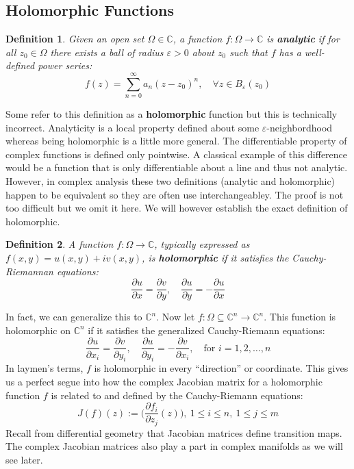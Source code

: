 \documentclass[12pt, letterpaper]{article}
\newtheorem{definition}{Definition}[section]
\newcommand{\C}{\mathbb{C}}
\newcommand{\ten}[1]{\textnormal{\textbf{#1}}}
\begin{document}
\subsection{Holomorphic Functions}

\begin{definition}\label{def 3.1}
    Given an open set $\Omega \in \C$, a function $f: \Omega \to \C$ is \ten{analytic}
    if for all $z_0 \in \Omega$ there exists a ball of radius $\varepsilon>0$ about
    $z_0$ such that $f$ has a well-defined power series:
    \begin{equation*}
        f(z) = \sum_{n=0}^\infty a_n (z-z_0)^n, \quad \forall z \in B_\varepsilon
        (z_0)
    \end{equation*}
\end{definition}

Some refer to this definition as a \textbf{holomorphic} function but this is technically
incorrect. Analyticity is a local property defined about some $\varepsilon$-neighbordhood
whereas being holomorphic is a little more general. The differentiable property of
complex functions is defined only pointwise. A classical example of this difference
would be a function that is only differentiable about a line and thus not analytic. 
However, in complex analysis these two definitions (analytic and holomorphic) happen
to be equivalent so they are often use interchangeabley. The proof is not too difficult
but we omit it here. We will however establish the exact definition of holomorphic.

\begin{definition}\label{3.2}
    A function $f: \Omega \to \C$, typically expressed as $f(x,y) = u(x,y) + iv(x,y)$,
    is \ten{holomorphic} if it satisfies the Cauchy-Riemannan
    equations:
    \begin{equation*}
        \dfrac{\partial u}{\partial x} = \dfrac{\partial v}{\partial y}, \quad
        \dfrac{\partial u}{\partial y} = - \dfrac{\partial u}{\partial x}
    \end{equation*}
\end{definition}
In fact, we can generalize this to $\C^n$. Now let $f: \Omega \subseteq \C^n \to
\C^n$. This function is holomorphic on $\C^n$ if it satisfies the generalized 
Cauchy-Riemann equations:
\begin{equation*}
    \dfrac{\partial u}{\partial x_i} = \dfrac{\partial v}{\partial y_i}, \quad 
    \dfrac{\partial u}{\partial y_i} = - \dfrac{\partial v}{\partial x_i},\quad
    \text{for } i = 1, 2, \hdots , n
\end{equation*} 
In laymen's terms, $f$ is holomorphic in every ``direction'' or coordinate. This
gives us a perfect segue into how the complex Jacobian matrix for a holomorphic function
$f$ is related to and defined by the Cauchy-Riemann equations:
\begin{equation*}
    J(f)(z):= \bigg(\dfrac{\partial f_i}{\partial z_j}(z)\bigg), \ 1 \leq i \leq n, \
    1 \leq j \leq m
\end{equation*}
Recall from differential geometry that Jacobian matrices define transition maps.
The complex Jacobian matrices also play a part in complex manifolds as we will see
later.
\end{document}
